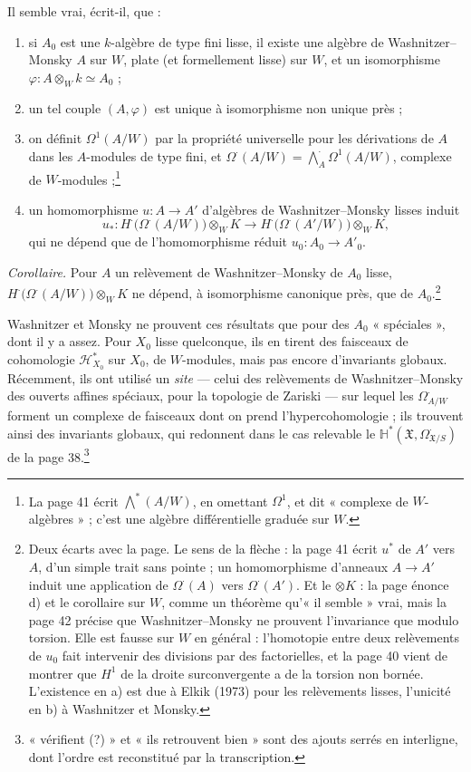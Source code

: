 \documentclass[11pt,a4paper]{article}
\begin{document}
Il semble vrai, écrit-il, que :
\begin{enumerate}
\item[a)] si $A_0$ est une $k$-algèbre de type fini lisse, il existe une
  algèbre de Washnitzer--Monsky $A$ sur $W$, plate (et formellement lisse)
  sur $W$, et un isomorphisme $\varphi : A \otimes_W k \simeq A_0$ ;
\item[b)] un tel couple $(A, \varphi)$ est unique à isomorphisme non unique
  près ;
\item[c)] on définit $\Omega^{1}(A/W)$ par la propriété universelle pour les
  dérivations de $A$ dans les $A$-modules de type fini, et
  $\Omega^{\cdot}(A/W) = \bigwedge^{\cdot}_{A} \Omega^{1}(A/W)$, complexe de
  $W$-modules ;\footnote{La page 41 écrit $\bigwedge^{*}(A/W)$, en omettant
  $\Omega^{1}$, et dit « complexe de $W$-algèbres » ; c'est une algèbre
  différentielle graduée sur $W$.}
\item[d)] un homomorphisme $u : A \to A'$ d'algèbres de
  Washnitzer--Monsky lisses induit
  \[
    u_{*} : H^{\cdot}\bigl(\Omega^{\cdot}(A/W)\bigr) \otimes_W K
    \longrightarrow H^{\cdot}\bigl(\Omega^{\cdot}(A'/W)\bigr) \otimes_W K ,
  \]
  qui ne dépend que de l'homomorphisme réduit $u_0 : A_0 \to A'_0$.
\end{enumerate}
\emph{Corollaire.} Pour $A$ un relèvement de Washnitzer--Monsky de $A_0$
lisse, $H^{\cdot}\bigl(\Omega^{\cdot}(A/W)\bigr) \otimes_W K$ ne dépend, à
isomorphisme canonique près, que de $A_0$.\footnote{Deux écarts avec la
page. Le sens de la flèche : la page 41 écrit $u^{*}$ de $A'$ vers $A$, d'un
simple trait sans pointe ; un homomorphisme d'anneaux $A \to A'$ induit une
application de $\Omega^{\cdot}(A)$ vers $\Omega^{\cdot}(A')$. Et le
$\otimes K$ : la page énonce d) et le corollaire sur $W$, comme un théorème
qu'« il semble » vrai, mais la page 42 précise que Washnitzer--Monsky ne
prouvent l'invariance que modulo torsion. Elle est fausse sur $W$ en
général : l'homotopie entre deux relèvements de $u_0$ fait intervenir des
divisions par des factorielles, et la page 40 vient de montrer que
$H^{1}$ de la droite surconvergente a de la torsion non bornée. L'existence
en a) est due à Elkik (1973) pour les relèvements lisses, l'unicité en b) à
Washnitzer et Monsky.}

Washnitzer et Monsky ne prouvent ces résultats que pour des $A_0$
« spéciales », dont il y a assez. Pour $X_0$ lisse quelconque, ils en
tirent des faisceaux de cohomologie $\mathcal{H}^{*}_{X_0}$ sur $X_0$, de
$W$-modules, mais pas encore d'invariants globaux. Récemment, ils ont
utilisé un \emph{site} — celui des relèvements de Washnitzer--Monsky des
ouverts affines spéciaux, pour la topologie de Zariski — sur lequel les
$\Omega^{\cdot}_{A/W}$ forment un complexe de faisceaux dont on prend
l'hypercohomologie ; ils trouvent ainsi des invariants globaux, qui redonnent
dans le cas relevable le $\mathbb{H}^{*}(\mathfrak{X},
\Omega^{\cdot}_{\mathfrak{X}/S})$ de la page 38.\footnote{« vérifient (?) » et
« ils retrouvent bien » sont des ajouts serrés en interligne, dont l'ordre
est reconstitué par la transcription.}
\end{document}
